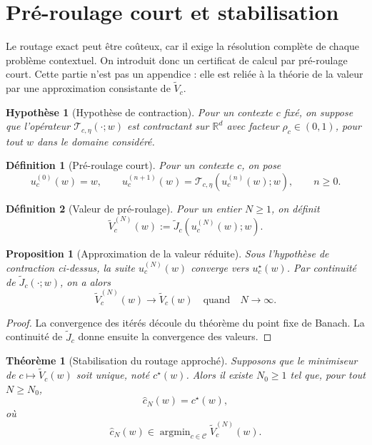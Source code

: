 \documentclass[11pt,a4paper]{article}
\newtheorem{definition}{Définition}[section]
\newtheorem{assumption}{Hypothèse}[section]
\newtheorem{proposition}{Proposition}[section]
\newtheorem{theorem}{Théorème}[section]
\DeclareMathOperator{\argmin}{argmin}
\newcommand{\R}{\mathbb R}
\newcommand{\Ccal}{\mathcal C}
\newcommand{\Tcal}{\mathcal T}
\begin{document}
\section{Pré-roulage court et stabilisation}

Le routage exact peut être coûteux, car il exige la résolution complète de chaque problème contextuel. On introduit donc un certificat de calcul par pré-roulage court. Cette partie n'est pas un appendice : elle est reliée à la théorie de la valeur par une approximation consistante de \(\widetilde V_c\).

\begin{assumption}[Hypothèse de contraction]
Pour un contexte \(c\) fixé, on suppose que l'opérateur \(\Tcal_{c,\eta}(\cdot;w)\) est contractant sur \(\R^d\) avec facteur \(\rho_c\in(0,1)\), pour tout \(w\) dans le domaine considéré.
\end{assumption}

\begin{definition}[Pré-roulage court]
Pour un contexte \(c\), on pose
\[
 u_c^{(0)}(w)=w,
\qquad
u_c^{(n+1)}(w)=\Tcal_{c,\eta}( u_c^{(n)}(w);w),
\qquad n\ge 0.
\]
\end{definition}

\begin{definition}[Valeur de pré-roulage]
Pour un entier \(N\ge 1\), on définit
\[
\widetilde V_c^{(N)}(w):=\widetilde J_c( u_c^{(N)}(w);w).
\]
\end{definition}

\begin{proposition}[Approximation de la valeur réduite]
Sous l'hypothèse de contraction ci-dessus, la suite \(u_c^{(N)}(w)\) converge vers \(u_c^\star(w)\). Par continuité de \(\widetilde J_c(\cdot;w)\), on a alors
\[
\widetilde V_c^{(N)}(w)\longrightarrow \widetilde V_c(w)
\quad\text{quand}\quad N\to\infty.
\]
\end{proposition}

\begin{proof}
La convergence des itérés découle du théorème du point fixe de Banach. La continuité de \(\widetilde J_c\) donne ensuite la convergence des valeurs.
\end{proof}

\begin{theorem}[Stabilisation du routage approché]
Supposons que le minimiseur de \(c\mapsto \widetilde V_c(w)\) soit unique, noté \(c^\star(w)\). Alors il existe \(N_0\ge 1\) tel que, pour tout \(N\ge N_0\),
\[
\hat c_N(w)=c^\star(w),
\]
où
\[
\hat c_N(w)\in\argmin_{c\in\Ccal}\widetilde V_c^{(N)}(w).
\]
\end{theorem}
\end{document}
